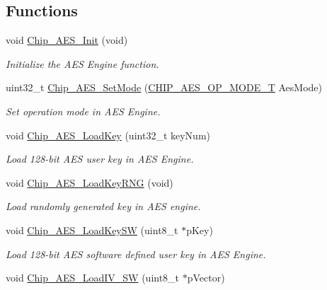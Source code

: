 \subsection*{Functions}
\begin{DoxyCompactItemize}
\item 
void \hyperlink{group___a_e_s__18_x_x__43_x_x_gafdf5bd7d491d506493c5989097221f2b}{Chip\+\_\+\+A\+E\+S\+\_\+\+Init} (void)
\begin{DoxyCompactList}\small\item\em Initialize the A\+ES Engine function. \end{DoxyCompactList}\item 
uint32\+\_\+t \hyperlink{group___a_e_s__18_x_x__43_x_x_gaa78732f8682a60cb228dc9c11bf18484}{Chip\+\_\+\+A\+E\+S\+\_\+\+Set\+Mode} (\hyperlink{group___a_e_s__18_x_x__43_x_x_ga8dd50510d4144a9b12042487fdd42813}{C\+H\+I\+P\+\_\+\+A\+E\+S\+\_\+\+O\+P\+\_\+\+M\+O\+D\+E\+\_\+T} Aes\+Mode)
\begin{DoxyCompactList}\small\item\em Set operation mode in A\+ES Engine. \end{DoxyCompactList}\item 
void \hyperlink{group___a_e_s__18_x_x__43_x_x_gaa72ef978d5d346c71a7db8d9d9d5e2a7}{Chip\+\_\+\+A\+E\+S\+\_\+\+Load\+Key} (uint32\+\_\+t key\+Num)
\begin{DoxyCompactList}\small\item\em Load 128-\/bit A\+ES user key in A\+ES Engine. \end{DoxyCompactList}\item 
void \hyperlink{group___a_e_s__18_x_x__43_x_x_ga42594f5deded064b6f03ee79af7d0aa8}{Chip\+\_\+\+A\+E\+S\+\_\+\+Load\+Key\+R\+NG} (void)
\begin{DoxyCompactList}\small\item\em Load randomly generated key in A\+ES engine. \end{DoxyCompactList}\item 
void \hyperlink{group___a_e_s__18_x_x__43_x_x_ga395abcf71c77a979c3ce44c8e4d7abe9}{Chip\+\_\+\+A\+E\+S\+\_\+\+Load\+Key\+SW} (uint8\+\_\+t $\ast$p\+Key)
\begin{DoxyCompactList}\small\item\em Load 128-\/bit A\+ES software defined user key in A\+ES Engine. \end{DoxyCompactList}\item 
void \hyperlink{group___a_e_s__18_x_x__43_x_x_ga9585571d1a075ed01c739217ca65ffbc}{Chip\+\_\+\+A\+E\+S\+\_\+\+Load\+I\+V\+\_\+\+SW} (uint8\+\_\+t $\ast$p\+Vector)

\end{DoxyCompactItemize}
